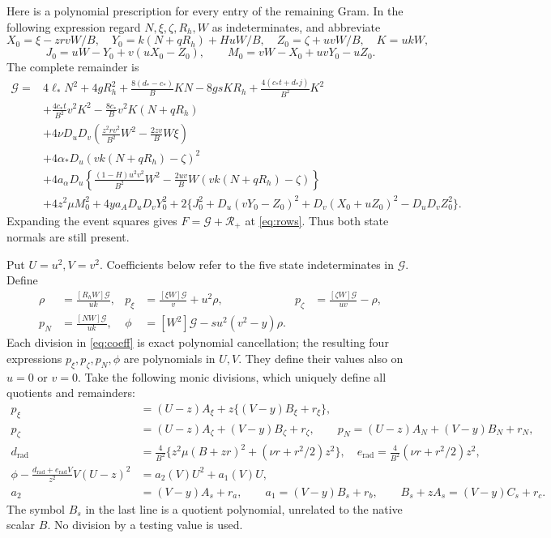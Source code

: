 \documentclass[10pt]{article}
\newcommand{\Du}{D_u}
\newcommand{\Dv}{D_v}
\newcommand{\coef}[1]{[#1]}
\begin{document}
Here is a polynomial prescription for every entry of the remaining Gram.
In the following expression regard \(N,\xi,\zeta,R_h,W\) as indeterminates,
and abbreviate
\[
 X_0=\xi-zrvW/B,\quad Y_0=k(N+qR_h)+HuW/B,\quad
 Z_0=\zeta+uvW/B,\quad K=ukW,
\]
\[
 J_0=uW-Y_0+v(uX_0-Z_0),\qquad
 M_0=vW-X_0+uvY_0-uZ_0.
\]
The complete remainder is
\begin{equation}
\begin{split}
 \mathcal G={}&4\ell_*N^2+4gR_h^2
 +\frac{8(d_*-c_*)}{B}KN-8gsKR_h
 +\frac{4(c_*t+d_*j)}{B^2}K^2\\
 &+\frac{4c_*t}{B^2}v^2K^2-\frac{8c_*}{B}v^2K(N+qR_h)\\
 &+4\nu\Du\Dv\left(\frac{z^2rv^2}{B^2}W^2-\frac{2zv}{B}W\xi\right)\\
 &+4\alpha_*\Du(vk(N+qR_h)-\zeta)^2\\
 &+4a_\alpha\Du\left\{\frac{(1-H)u^2v^2}{B^2}W^2
       -\frac{2uv}{B}W(vk(N+qR_h)-\zeta)\right\}\\
 &+4z^2\mu M_0^2+4ya_A\Du\Dv Y_0^2
 +2\{J_0^2+\Du(vY_0-Z_0)^2+\Dv(X_0+uZ_0)^2-\Du\Dv Z_0^2\}.
\end{split}\label{eq:G}
\end{equation}
Expanding the event squares gives \(F=\mathcal G+\mathcal R_+\) at
\eqref{eq:rows}. Thus both state normals are still present.

Put \(U=u^2,V=v^2\). Coefficients below refer to the five state
indeterminates in \(\mathcal G\). Define
\begin{align}
 \rho&=\frac{\coef{R_hW}\mathcal G}{uk},&
 p_\xi&=\frac{\coef{\xi W}\mathcal G}{v}+u^2\rho,&
 p_\zeta&=\frac{\coef{\zeta W}\mathcal G}{uv}-\rho,\nonumber\\
 p_N&=\frac{\coef{NW}\mathcal G}{uk},&
 \phi&=\coef{W^2}\mathcal G-su^2(v^2-y)\rho.          \label{eq:coeff}
\end{align}
Each division in \eqref{eq:coeff} is exact polynomial cancellation;
the resulting four expressions \(p_\xi,p_\zeta,p_N,\phi\) are
polynomials in \(U,V\). They define their values also on \(u=0\) or \(v=0\).
Take the following monic divisions, which uniquely define all quotients
and remainders:
\begin{align}
 p_\xi&=(U-z)A_\xi+z\{(V-y)B_\xi+r_\xi\},\nonumber\\
 p_\zeta&=(U-z)A_\zeta+(V-y)B_\zeta+r_\zeta,\qquad
 p_N=(U-z)A_N+(V-y)B_N+r_N,                         \label{eq:divnormal}\\
 d_{\mathrm{rad}}&=\frac4{B^2}\{z^2\mu(B+zr)^2+(\nu r+r^2/2)z^2\},\quad
 e_{\mathrm{rad}}=\frac4{B^2}(\nu r+r^2/2)z^2,\nonumber\\
 \phi-\frac{d_{\mathrm{rad}}+e_{\mathrm{rad}}V}{z^2}V(U-z)^2
       &=a_2(V)U^2+a_1(V)U,\nonumber\\
 a_2&=(V-y)A_s+r_a,\qquad a_1=(V-y)B_s+r_b,\qquad
 B_s+zA_s=(V-y)C_s+r_c.                            \label{eq:divscalar}
\end{align}
The symbol \(B_s\) in the last line is a quotient polynomial, unrelated
to the native scalar \(B\). No division by a testing value is used.
\end{document}
